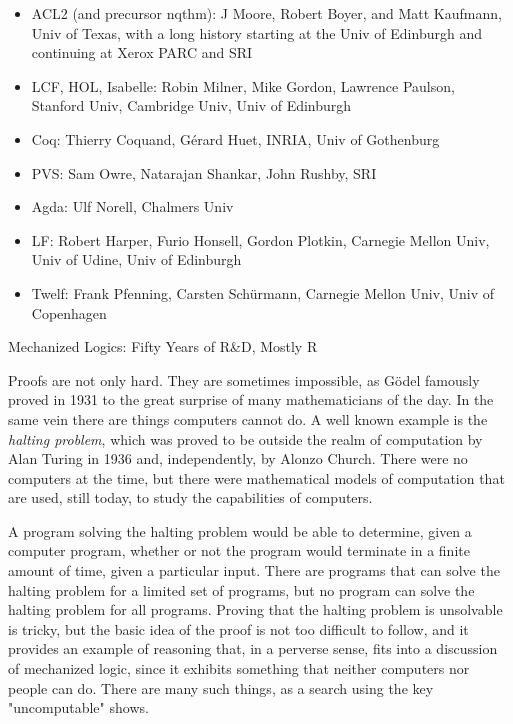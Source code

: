 \begin{aside}
\begin{itemize}
\item ACL2 (and precursor nqthm): J Moore, Robert Boyer, and Matt Kaufmann, Univ of Texas, with a long history starting at the Univ of Edinburgh and continuing at Xerox PARC and SRI
\item LCF, HOL, Isabelle: Robin Milner, Mike Gordon, Lawrence Paulson, Stanford Univ, Cambridge Univ, Univ of Edinburgh
\item Coq: Thierry Coquand, G\'erard Huet, INRIA, Univ of Gothenburg
\item PVS: Sam Owre, Natarajan Shankar, John Rushby, SRI
\item Agda: Ulf Norell, Chalmers Univ
\item LF: Robert Harper, Furio Honsell, Gordon Plotkin, Carnegie Mellon Univ, Univ of Udine, Univ of Edinburgh
\item Twelf: Frank Pfenning, Carsten Sch\"urmann, Carnegie Mellon Univ, Univ of Copenhagen
\end{itemize}
\caption{Mechanized Logics: Fifty Years of R\&D, Mostly R}
\label{mechanized-logic-history}
\end{aside}

Proofs are not only hard.
They are sometimes impossible, as G\"odel famously proved in 1931
to the great surprise of many mathematicians of the day.
In the same vein there are things computers cannot do.
A well known example is the  \emph{halting problem}, which
was proved to be outside the realm of computation
by Alan Turing in 1936
and, independently, by Alonzo Church.
There were no computers at the time,
but there were mathematical models of computation
that are used, still today, to study the capabilities of computers.

A program solving the
halting problem would be able to determine,
given a computer program, whether or not the program would terminate
in a finite amount of time, given a particular input.
There are programs that can solve the halting problem for
a limited set of programs,
but no program can solve the halting problem for all programs.
Proving that the halting problem is unsolvable is tricky,
but the basic idea of the proof is not too difficult to follow, and
it provides an example of reasoning that,
in a perverse sense, fits into a discussion of mechanized logic,
since it exhibits something that neither computers
nor people can do. There are many such things, as a search
using the key "uncomputable" shows.

